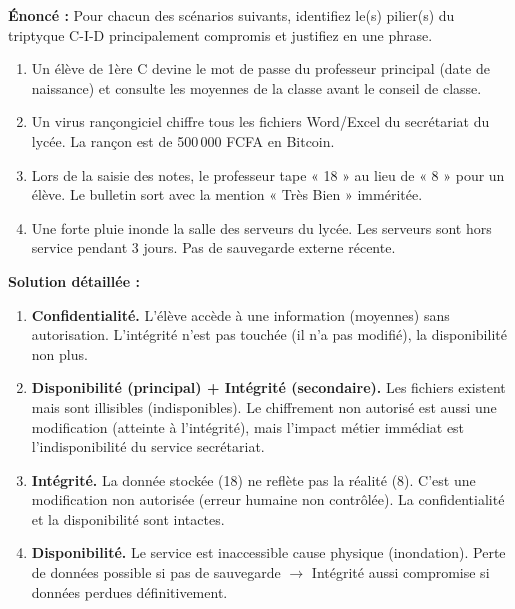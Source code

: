 \documentclass[11pt]{article}
\begin{document}
\begin{exoresolu}
\textbf{Énoncé :} Pour chacun des scénarios suivants, identifiez le(s) pilier(s) du triptyque C-I-D principalement compromis et justifiez en une phrase.

\begin{enumerate}
    \item Un élève de 1ère C devine le mot de passe du professeur principal (date de naissance) et consulte les moyennes de la classe avant le conseil de classe.
    \item Un virus rançongiciel chiffre tous les fichiers Word/Excel du secrétariat du lycée. La rançon est de 500\,000 FCFA en Bitcoin.
    \item Lors de la saisie des notes, le professeur tape « 18 » au lieu de « 8 » pour un élève. Le bulletin sort avec la mention « Très Bien » imméritée.
    \item Une forte pluie inonde la salle des serveurs du lycée. Les serveurs sont hors service pendant 3 jours. Pas de sauvegarde externe récente.
\end{enumerate}

\tcblower
\textbf{Solution détaillée :}

\begin{enumerate}
    \item \textbf{Confidentialité.} L'élève accède à une information (moyennes) sans autorisation. L'intégrité n'est pas touchée (il n'a pas modifié), la disponibilité non plus.
    \item \textbf{Disponibilité (principal) + Intégrité (secondaire).} Les fichiers existent mais sont illisibles (indisponibles). Le chiffrement non autorisé est aussi une modification (atteinte à l'intégrité), mais l'impact métier immédiat est l'indisponibilité du service secrétariat.
    \item \textbf{Intégrité.} La donnée stockée (18) ne reflète pas la réalité (8). C'est une modification non autorisée (erreur humaine non contrôlée). La confidentialité et la disponibilité sont intactes.
    \item \textbf{Disponibilité.} Le service est inaccessible cause physique (inondation). Perte de données possible si pas de sauvegarde $\to$ Intégrité aussi compromise si données perdues définitivement.
\end{enumerate}
\end{exoresolu}
\end{document}
